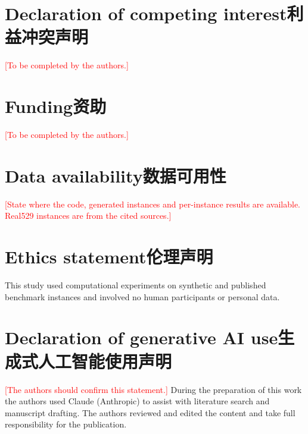 \documentclass[preprint,12pt,authoryear]{elsarticle}
\newcommand{\placeholder}[1]{\textcolor{red}{[#1]}}
\begin{document}
\section*{Declaration of competing interest\quad 利益冲突声明}
\placeholder{To be completed by the authors.}

\section*{Funding\quad 资助}
\placeholder{To be completed by the authors.}

\section*{Data availability\quad 数据可用性}
\placeholder{State where the code, generated instances and per-instance results are available. Real529 instances are from the cited sources.}

\section*{Ethics statement\quad 伦理声明}
This study used computational experiments on synthetic and published benchmark instances and involved no human participants or personal data.

\section*{Declaration of generative AI use\quad 生成式人工智能使用声明}
\placeholder{The authors should confirm this statement.} During the preparation of this work the authors used Claude (Anthropic) to assist with literature search and manuscript drafting. The authors reviewed and edited the content and take full responsibility for the publication.



\end{document}
